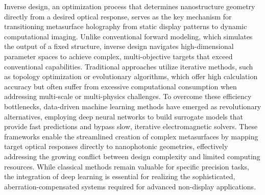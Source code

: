 \documentclass[11pt]{article}
\begin{document}
Inverse design, an optimization process that determines nanostructure geometry directly from a desired optical response, serves as the key mechanism for transitioning metasurface holography from static display patterns to dynamic computational imaging. \citep{doi_10_48550_arxiv_2506_21748_dc49c062} \citep{doi_10_1117_12_3099014_831c7349} Unlike conventional forward modeling, which simulates the output of a fixed structure, inverse design navigates high-dimensional parameter spaces to achieve complex, multi-objective targets that exceed conventional capabilities. Traditional approaches utilize iterative methods, such as topology optimization or evolutionary algorithms, which offer high calculation accuracy but often suffer from excessive computational consumption when addressing multi-scale or multi-physics challenges. To overcome these efficiency bottlenecks, data-driven machine learning methods have emerged as revolutionary alternatives, employing deep neural networks to build surrogate models that provide fast predictions and bypass slow, iterative electromagnetic solvers. These frameworks enable the streamlined creation of complex metasurfaces by mapping target optical responses directly to nanophotonic geometries, effectively addressing the growing conflict between design complexity and limited computing resources. While classical methods remain valuable for specific precision tasks, the integration of deep learning is essential for realizing the sophisticated, aberration-compensated systems required for advanced non-display applications. \citep{doi_10_1088_1361_6439_ad3a72_72d60f33} \citep{doi_10_48550_arxiv_2204_00433_1c5cfd3e}
\end{document}
